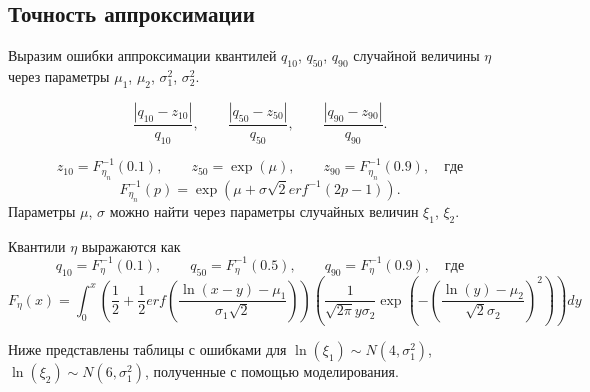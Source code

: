 \documentclass[12pt]{article}
\begin{document}
\subsection{Точность аппроксимации}

Выразим ошибки аппроксимации квантилей $q_{10}$, $q_{50}$, $q_{90}$ случайной величины $\eta$ через параметры $\mu_{1}$, $\mu_{2}$, $\sigma_{1}^{2}$, $\sigma_{2}^{2}$.

\[\dfrac{\left| q_{10} - z_{10}\right|}{q_{10}}, \quad\quad \dfrac{\left| q_{50} - z_{50}\right|}{q_{50}}, \quad\quad \dfrac{\left| q_{90} - z_{90}\right|}{q_{90}}.\]

\[z_{10} = F_{\eta_{n}}^{-1}(0.1), \quad\quad z_{50} = \exp(\mu), \quad\quad z_{90} = F_{\eta_{n}}^{-1}(0.9), \quad где\]
\[F_{\eta_{n}}^{-1}(p) = \exp(\mu+\sigma\sqrt{2}erf^{-1}(2p-1)).\]
Параметры $\mu$, $\sigma$ можно найти через параметры случайных величин $\xi_{1}$, $\xi_{2}$.

Квантили $\eta$ выражаются как
\[q_{10} = F_{\eta}^{-1}(0.1), \quad\quad q_{50} = F_{\eta}^{-1}(0.5), \quad\quad q_{90} = F_{\eta}^{-1}(0.9), \quad где\]
\[F_{\eta}(x) = \int_{0}^{x}\left( \dfrac{1}{2}+\dfrac{1}{2}erf\left( \dfrac{\ln(x-y)-\mu_{1}}{\sigma_{1}\sqrt{2}}\right) \right) \left( \dfrac{1}{\sqrt{2\pi}y\sigma_{2}}\exp\left( -\left( \dfrac{\ln(y)-\mu_{2}}{\sqrt{2}\sigma_{2}}\right) ^{2}\right) \right) dy \]

Ниже представлены таблицы с ошибками для $\ln(\xi_{1}) \sim N(4, \sigma _{1}^{2})$, $\ln(\xi_{2}) \sim N(6, \sigma _{1}^{2})$, полученные с помощью моделирования.

\end{document}
